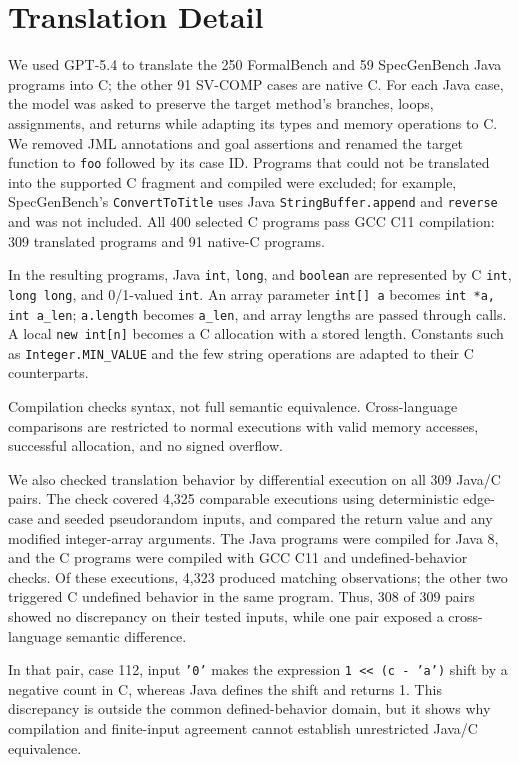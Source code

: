 \section{{Translation Detail}}
\label{app:benchmark-translation}

{We used GPT-5.4 to translate the 250 FormalBench and 59 SpecGenBench Java programs into C; the other 91 SV-COMP cases are native C. For each Java case, the model was asked to preserve the target method's branches, loops, assignments, and returns while adapting its types and memory operations to C. We removed JML annotations and goal assertions and renamed the target function to \texttt{foo} followed by its case ID. Programs that could not be translated into the supported C fragment and compiled were excluded; for example, SpecGenBench's \texttt{ConvertToTitle} uses Java \texttt{StringBuffer.append} and \texttt{reverse} and was not included. All 400 selected C programs pass GCC C11 compilation: 309 translated programs and 91 native-C programs.}

{In the resulting programs, Java \texttt{int}, \texttt{long}, and \texttt{boolean} are represented by C \texttt{int}, \texttt{long long}, and 0/1-valued \texttt{int}. An array parameter \texttt{int[] a} becomes \texttt{int *a, int a\_len}; \texttt{a.length} becomes \texttt{a\_len}, and array lengths are passed through calls. A local \texttt{new int[n]} becomes a C allocation with a stored length. Constants such as \texttt{Integer.MIN\_VALUE} and the few string operations are adapted to their C counterparts.}

{Compilation checks syntax, not full semantic equivalence. Cross-language comparisons are restricted to normal executions with valid memory accesses, successful allocation, and no signed overflow.}

{We also checked translation behavior by differential execution on all 309 Java/C pairs. The check covered 4,325 comparable executions using deterministic edge-case and seeded pseudorandom inputs, and compared the return value and any modified integer-array arguments. The Java programs were compiled for Java 8, and the C programs were compiled with GCC C11 and undefined-behavior checks. Of these executions, 4,323 produced matching observations; the other two triggered C undefined behavior in the same program. Thus, 308 of 309 pairs showed no discrepancy on their tested inputs, while one pair exposed a cross-language semantic difference.}

{In that pair, case 112, input \texttt{'0'} makes the expression \texttt{1 << (c - 'a')} shift by a negative count in C, whereas Java defines the shift and returns 1. This discrepancy is outside the common defined-behavior domain, but it shows why compilation and finite-input agreement cannot establish unrestricted Java/C equivalence.}
